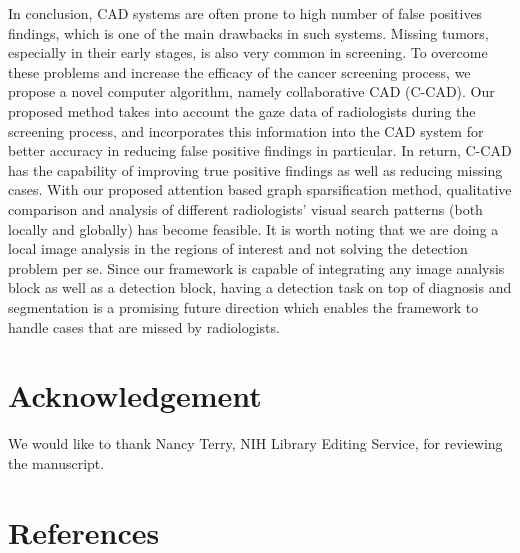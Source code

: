 \documentclass[preprint,12pt]{elsarticle}
\begin{document}


In conclusion, CAD systems are often prone to high number of false positives findings, which is one of the main drawbacks in such systems. Missing tumors, especially in their early stages, is also very common in screening. To overcome these problems and increase the efficacy of the cancer screening process, we propose a novel computer algorithm, namely collaborative CAD (C-CAD). Our proposed method takes into account the gaze data of radiologists during the screening process, and incorporates this information into the CAD system for better accuracy in reducing false positive findings in particular. In return, C-CAD has the capability of improving true positive findings as well as reducing missing cases.%
With our proposed attention based graph sparsification method, qualitative comparison and analysis of different radiologists' visual search patterns (both locally and globally) has become feasible. It is worth noting that we are doing a local image analysis in the regions of interest and not solving the detection problem per se. Since our framework is capable of integrating any image analysis block as well as a detection block, having a detection task on top of diagnosis and segmentation is a promising future direction which enables the framework to handle cases that are missed by radiologists.


\section*{Acknowledgement }
We would like to thank Nancy Terry, NIH Library Editing Service, for reviewing the manuscript.
\section*{References}

\end{document}
